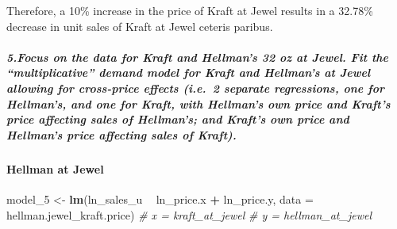 \documentclass[]{article}
\newenvironment{Shaded}{\begin{snugshade}}{\end{snugshade}}
\newcommand{\CommentTok}[1]{\textcolor[rgb]{0.56,0.35,0.01}{\textit{#1}}}
\newcommand{\DataTypeTok}[1]{\textcolor[rgb]{0.13,0.29,0.53}{#1}}
\newcommand{\DecValTok}[1]{\textcolor[rgb]{0.00,0.00,0.81}{#1}}
\newcommand{\KeywordTok}[1]{\textcolor[rgb]{0.13,0.29,0.53}{\textbf{#1}}}
\newcommand{\NormalTok}[1]{#1}
\newcommand{\OperatorTok}[1]{\textcolor[rgb]{0.81,0.36,0.00}{\textbf{#1}}}
\newcommand{\StringTok}[1]{\textcolor[rgb]{0.31,0.60,0.02}{#1}}
\let\oldparagraph\paragraph
\renewcommand{\paragraph}[1]{\oldparagraph{#1}\mbox{}}
\let\oldsubparagraph\subparagraph
\renewcommand{\subparagraph}[1]{\oldsubparagraph{#1}\mbox{}}
\begin{document}
\begin{Shaded}
\end{Shaded}

Therefore, a 10\% increase in the price of Kraft at Jewel results in a
32.78\% decrease in unit sales of Kraft at Jewel ceteris paribus.

\hypertarget{focus-on-the-data-for-kraft-and-hellmans-32-oz-at-jewel.-fit-the-multiplicative-demand-model-for-kraft-and-hellmans-at-jewel-allowing-for-cross-price-effects-i.e.2-separate-regressions-one-for-hellmans-and-one-for-kraft-with-hellmans-own-price-and-krafts-price-affecting-sales-of-hellmans-and-krafts-own-price-and-hellmans-price-affecting-sales-of-kraft.}{%
\subparagraph{5.Focus on the data for Kraft and Hellman's 32 oz at
Jewel. Fit the ``multiplicative'' demand model for Kraft and Hellman's
at Jewel allowing for cross-price effects (i.e.~2 separate regressions,
one for Hellman's, and one for Kraft, with Hellman's own price and
Kraft's price affecting sales of Hellman's; and Kraft's own price and
Hellman's price affecting sales of
Kraft).}\label{focus-on-the-data-for-kraft-and-hellmans-32-oz-at-jewel.-fit-the-multiplicative-demand-model-for-kraft-and-hellmans-at-jewel-allowing-for-cross-price-effects-i.e.2-separate-regressions-one-for-hellmans-and-one-for-kraft-with-hellmans-own-price-and-krafts-price-affecting-sales-of-hellmans-and-krafts-own-price-and-hellmans-price-affecting-sales-of-kraft.}}

\hypertarget{hellman-at-jewel-2}{%
\paragraph{Hellman at Jewel}\label{hellman-at-jewel-2}}

\begin{Shaded}
\begin{Highlighting}[]
\NormalTok{model_}\DecValTok{5}\NormalTok{ <-}\StringTok{ }\KeywordTok{lm}\NormalTok{(ln_sales_u }\OperatorTok{~}\StringTok{ }\NormalTok{ln_price.x }\OperatorTok{+}\StringTok{ }\NormalTok{ln_price.y, }\DataTypeTok{data =}\NormalTok{ hellman.jewel_kraft.price)}
\CommentTok{# x = kraft_at_jewel}
\CommentTok{# y = hellman_at_jewel}
\end{Highlighting}
\end{Shaded}
\end{document}
